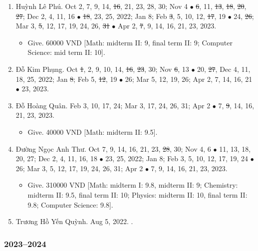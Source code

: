 \documentclass{article}
\begin{document}
\begin{enumerate}
\begin{itemize}
	\end{itemize}
	\item {\sc Huỳnh Lê Phú.} {\sf[In]} Oct 2, 7, 9, 14, \st{16}, 21, 23, 28, 30; Nov 4 $\bullet$ \st{6}, 11, \st{13}, \st{18}, \st{20}, \st{27}; Dec 2, 4, 11, 16 $\bullet$ \st{18}, 23, 25, 2022; Jan 8; Feb \st{3}, 5, 10, 12, \st{17}, 19 $\bullet$ 24, \st{26}; Mar 3, \st{5}, 12, 17, 19, 24, 26, \st{31} $\bullet$ Apr 2, \st{7}, 9, 14, 16, 21, 23, 2023.
	\begin{itemize}
		\item {\sf Give.} 60000 VND [Math: midterm II: 9, final term II: 9; Computer Science: mid term II: 10].
	\end{itemize}
	\item {\sc Đỗ Kim Phụng.} {\sf[In]} Oct \st{1}, 2, 9, 10, 14, \st{16}, \st{23}, 30; Nov \st{6}, 13 $\bullet$ 20, \st{27}, Dec 4, 11, 18, 25, 2022; Jan \st{8}; Feb 5, \st{12}, 19 $\bullet$ 26; Mar 5, 12, 19, 26; Apr 2, 7, 14, 16, 21 $\bullet$ 23, 2023.
	\item {\sc Đỗ Hoàng Quân.} {\sf[In]} Feb 3, 10, 17, 24; Mar 3, 17, 24, 26, 31; Apr 2 $\bullet$ 7, \st{9}, 14, 16, 21, 23, 2023.
	\begin{itemize}
		\item {\sf Give.} 40000 VND [Math: midterm II: 9.5].
	\end{itemize}
	\item {\sc Đường Ngọc Anh Thư.} {\sf[In]} Oct 7, 9, 14, 16, 21, 23, \st{28}, 30; Nov 4, 6 $\bullet$ 11, 13, 18, 20, 27; Dec 2, 4, 11, 16, 18 $\bullet$ 23, 25, 2022; Jan 8; Feb 3, 5, 10, 12, 17, 19, 24 $\bullet$ 26; Mar 3, 5, 12, 17, 19, 24, 26, 31; Apr 2 $\bullet$ 7, 9, 14, 16, 21, 23, 2023.
	\begin{itemize}
		\item {\sf Give.} 310000 VND [Math: midterm I: 9.8, midterm II: 9; Chemistry: midterm II: 9.5, final term II: 10; Physics: midterm II: 10, final term II: 9.8; Computer Science: 9.8].
	\end{itemize}
	\item {\sc Trương Hồ Yến Quỳnh.} {\sf[In]} Aug 5, 2022. {\sf[Out]}.
\end{enumerate}

\subsubsection{2023--2024}
\end{document}

